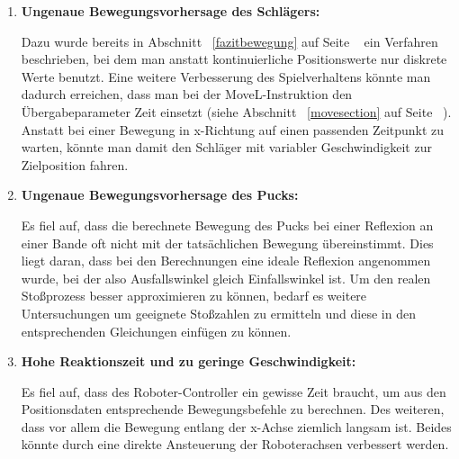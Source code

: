 \begin{enumerate}
\item \textbf{Ungenaue Bewegungsvorhersage des Schlägers:} 

Dazu wurde bereits in Abschnitt ~\ref{fazitbewegung} auf Seite ~\pageref{fazitbewegung} ein Verfahren beschrieben, bei dem man anstatt kontinuierliche Positionswerte nur diskrete Werte benutzt. 
Eine weitere Verbesserung des Spielverhaltens könnte man dadurch erreichen, dass man bei der MoveL-Instruktion den Übergabeparameter Zeit einsetzt (siehe Abschnitt ~\ref{movesection} auf Seite ~\pageref{movesection}). Anstatt bei einer Bewegung in x-Richtung auf einen passenden Zeitpunkt zu warten, könnte man damit den Schläger mit variabler Geschwindigkeit zur Zielposition fahren.     
 
\item \textbf{Ungenaue Bewegungsvorhersage des Pucks:}

Es fiel auf, dass die berechnete Bewegung des Pucks bei einer Reflexion an einer Bande oft nicht mit der tatsächlichen Bewegung übereinstimmt. Dies liegt daran, dass bei den Berechnungen eine ideale Reflexion angenommen wurde, bei der also Ausfallswinkel gleich Einfallswinkel ist. Um den realen Stoßprozess besser approximieren zu können, bedarf es weitere Untersuchungen um geeignete Stoßzahlen zu ermitteln und diese in den entsprechenden Gleichungen einfügen zu können.

\item \textbf{Hohe Reaktionszeit und zu geringe Geschwindigkeit:}

Es fiel auf, dass des Roboter-Controller ein gewisse Zeit braucht, um aus den Positionsdaten entsprechende Bewegungsbefehle zu berechnen. Des weiteren, dass vor allem die Bewegung entlang der x-Achse ziemlich langsam ist. Beides könnte durch eine direkte Ansteuerung der Roboterachsen verbessert werden.   

\end{enumerate}


